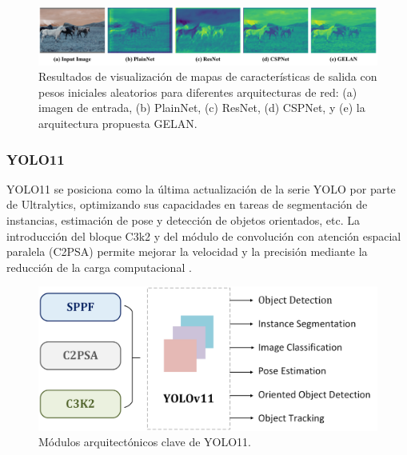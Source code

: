 \begin{figure}[htbp]
    \centering
    \includegraphics[width=0.95\linewidth]{figures/Mapas de caracteristicas YOLOv9.png}
    \caption[Mapas de características para diferentes arquitecturas de red (PlainNet, ResNet, CSPNet y GELAN)]{Resultados de visualización de mapas de características de salida con pesos iniciales aleatorios para diferentes arquitecturas de red: (a) imagen de entrada, (b) PlainNet, (c) ResNet, (d) CSPNet, y (e) la arquitectura propuesta GELAN.}
\end{figure}

\subsubsection{YOLO11}
YOLO11 \cite{yolo11_ultralytics} se posiciona como la última actualización de la serie YOLO por parte de Ultralytics, optimizando sus capacidades en tareas de segmentación de instancias, estimación de pose y detección de objetos orientados, etc. La introducción del bloque C3k2 y del módulo de convolución con atención espacial paralela (C2PSA) permite mejorar la velocidad y la precisión mediante la reducción de la carga computacional \cite{YOLOv11}.

\begin{figure}[htbp]
    \centering
    \includegraphics[width=0.7\linewidth]{figures/Model YOLO11.png}
    \caption[Módulos arquitectónicos clave de YOLO11]{Módulos arquitectónicos clave de YOLO11.}
\end{figure}

